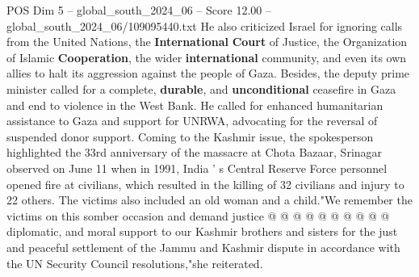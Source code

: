 \begin{textsample}{POS Dim 5 – global\_south\_2024\_06 – Score 12.00 – global\_south\_2024\_06/109095440.txt}
He also criticized Israel for ignoring calls from the United Nations, the \textbf{International} \textbf{Court} of Justice, the Organization of Islamic \textbf{Cooperation}, the wider \textbf{international} community, and even its own allies to halt its aggression against the people of Gaza.
Besides, the deputy prime minister called for a complete, \textbf{durable}, and \textbf{unconditional} ceasefire in Gaza and end to violence in the West Bank.
He called for enhanced humanitarian assistance to Gaza and support for UNRWA, advocating for the reversal of suspended donor support.
Coming to the Kashmir issue, the spokesperson highlighted the 33rd anniversary of the massacre at Chota Bazaar, Srinagar observed on June 11 when in 1991, India ' s Central Reserve Force personnel opened fire at civilians, which resulted in the killing of 32 civilians and injury to 22 others.
The victims also included an old woman and a child."We remember the victims on this somber occasion and demand justice @ @ @ @ @ @ @ @ @ @ diplomatic, and moral support to our Kashmir brothers and sisters for the just and peaceful settlement of the Jammu and Kashmir dispute in accordance with the UN Security Council resolutions,"she reiterated.

\end{textsample}
